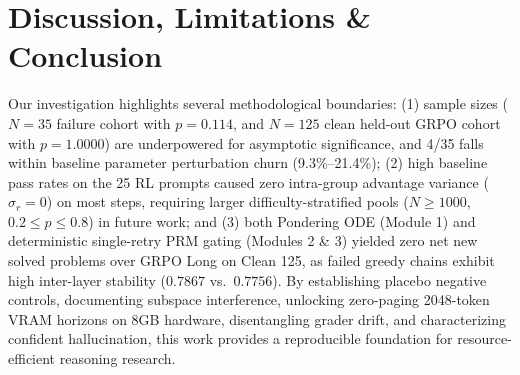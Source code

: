 \documentclass[11pt,a4paper]{article}
\begin{document}
\section{Discussion, Limitations \& Conclusion}

Our investigation highlights several methodological boundaries: (1) sample sizes ($N=35$ failure cohort with $p=0.114$, and $N=125$ clean held-out GRPO cohort with $p=1.0000$) are underpowered for asymptotic significance, and 4/35 falls within baseline parameter perturbation churn (9.3\%--21.4\%); (2) high baseline pass rates on the 25 RL prompts caused zero intra-group advantage variance ($\sigma_r=0$) on most steps, requiring larger difficulty-stratified pools ($N \ge 1000$, $0.2 \le p \le 0.8$) in future work; and (3) both Pondering ODE (Module 1) and deterministic single-retry PRM gating (Modules 2 \& 3) yielded zero net new solved problems over GRPO Long on Clean 125, as failed greedy chains exhibit high inter-layer stability ($0.7867$ vs.\ $0.7756$). By establishing placebo negative controls, documenting subspace interference, unlocking zero-paging 2048-token VRAM horizons on 8GB hardware, disentangling grader drift, and characterizing confident hallucination, this work provides a reproducible foundation for resource-efficient reasoning research.
\end{document}

